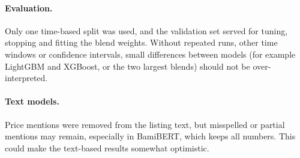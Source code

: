 \paragraph{Evaluation.}
Only one time-based split was used, and the validation set served for tuning, stopping and fitting the blend weights. Without repeated runs, other time windows or confidence intervals, small differences between models (for example LightGBM and XGBoost, or the two largest blends) should not be over-interpreted.

\paragraph{Text models.}
Price mentions were removed from the listing text, but misspelled or partial mentions may remain, especially in BamiBERT, which keeps all numbers. This could make the text-based results somewhat optimistic.

\endgroup

